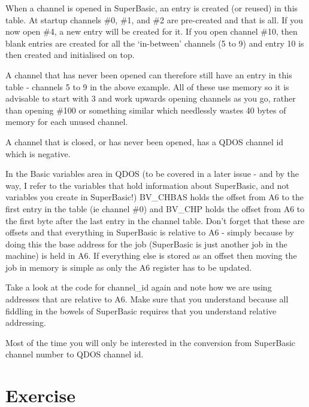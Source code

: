 When a channel is opened in SuperBasic, an entry is created (or
    reused) in this table. At startup channels \#0, \#1, and \#2 are pre-{}created
    and that is all. If you now open \#4, a new entry will be created for it.
    If you open channel \#10, then blank entries are created for all the
    `in-{}between' channels (5 to 9) and entry 10 is then created and
    initialised on top.

A channel that has never been opened can therefore still have an
    entry in this table -{} channels 5 to 9 in the above example. All of these
    use memory so it is advisable to start with 3 and work upwards opening
    channels as you go, rather than opening \#100 or something similar which
    needlessly wastes 40 bytes of memory for each unused channel.

A channel that is closed, or has never been opened, has a QDOS
    channel id which is negative.

In the Basic variables area in QDOS (to be covered in a later issue
    -{} and by the way, I refer to the variables that hold information about
    SuperBasic, and not variables you create in SuperBasic!) BV\_CHBAS holds
    the offset from A6 to the first entry in the table (ie channel \#0) and
    BV\_CHP holds the offset from A6 to the first byte after the last entry in
    the channel table. Don't forget that these are offsets and that everything
    in SuperBasic is relative to A6 -{} simply because by doing this the base
    address for the job (SuperBasic is just another job in the machine) is
    held in A6. If everything else is stored as an offset then moving the job
    in memory is simple as only the A6 register has to be updated.

Take a look at the code for channel\_id again and note how we are
    using addresses that are relative to A6. Make sure that you understand
    because all fiddling in the bowels of SuperBasic requires that you
    understand relative addressing.

Most of the time you will only be interested in the conversion from
    SuperBasic channel number to QDOS channel id.

\section{Exercise}
\label{ch7-exercise}%

